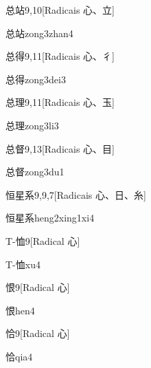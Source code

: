 \begin{entry}{总站}{9,10}[Radicais ⼼、⽴]
  \begin{phonetics}{总站}{zong3zhan4}
  \end{phonetics}
\end{entry}

\begin{entry}{总得}{9,11}[Radicais ⼼、⼻]
  \begin{phonetics}{总得}{zong3dei3}
  \end{phonetics}
\end{entry}

\begin{entry}{总理}{9,11}[Radicais ⼼、⽟]
  \begin{phonetics}{总理}{zong3li3}
  \end{phonetics}
\end{entry}

\begin{entry}{总督}{9,13}[Radicais ⼼、⽬]
  \begin{phonetics}{总督}{zong3du1}
  \end{phonetics}
\end{entry}

\begin{entry}{恒星系}{9,9,7}[Radicais ⼼、⽇、⽷]
  \begin{phonetics}{恒星系}{heng2xing1xi4}
  \end{phonetics}
\end{entry}

\begin{entry}{T-恤}{9}[Radical ⼼]
  \begin{phonetics}{T-恤}{xu4}
  \end{phonetics}
\end{entry}

\begin{entry}{恨}{9}[Radical ⼼]
  \begin{phonetics}{恨}{hen4}
  \end{phonetics}
\end{entry}

\begin{entry}{恰}{9}[Radical ⼼]
  \begin{phonetics}{恰}{qia4}
  \end{phonetics}
\end{entry}

